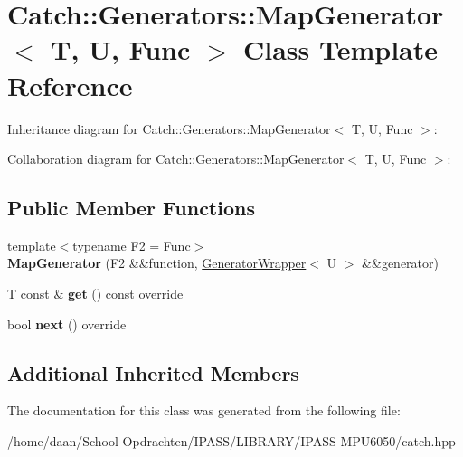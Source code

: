\hypertarget{classCatch_1_1Generators_1_1MapGenerator}{}\section{Catch\+:\+:Generators\+:\+:Map\+Generator$<$ T, U, Func $>$ Class Template Reference}
\label{classCatch_1_1Generators_1_1MapGenerator}


Inheritance diagram for Catch\+:\+:Generators\+:\+:Map\+Generator$<$ T, U, Func $>$\+:


Collaboration diagram for Catch\+:\+:Generators\+:\+:Map\+Generator$<$ T, U, Func $>$\+:
\subsection*{Public Member Functions}
\begin{DoxyCompactItemize}
\item 
\mbox{\label{classCatch_1_1Generators_1_1MapGenerator_a525c7eaf53ad220ee7add534aff2522c}} 
{\footnotesize template$<$typename F2  = Func$>$ }\\{\bfseries Map\+Generator} (F2 \&\&function, \hyperlink{classCatch_1_1Generators_1_1GeneratorWrapper}{Generator\+Wrapper}$<$ U $>$ \&\&generator)
\item 
\mbox{\label{classCatch_1_1Generators_1_1MapGenerator_a199d377afba00519f202c59b4b488235}} 
T const  \& {\bfseries get} () const override
\item 
\mbox{\label{classCatch_1_1Generators_1_1MapGenerator_aa07e2f12d38ae060c30cc30d9dc236c5}} 
bool {\bfseries next} () override
\end{DoxyCompactItemize}
\subsection*{Additional Inherited Members}


The documentation for this class was generated from the following file\+:\begin{DoxyCompactItemize}
\item 
/home/daan/\+School Opdrachten/\+I\+P\+A\+S\+S/\+L\+I\+B\+R\+A\+R\+Y/\+I\+P\+A\+S\+S-\/\+M\+P\+U6050/catch.\+hpp\end{DoxyCompactItemize}
